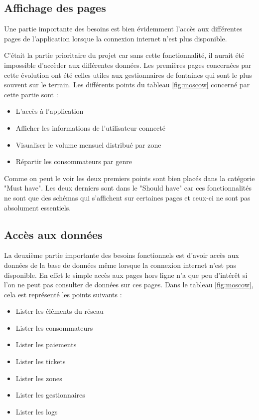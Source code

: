 \documentclass{EPL-master-thesis-covers-FR}
\begin{document}
			
			
			\subsection*{Affichage des pages}
				Une partie importante des besoins est bien évidemment l'accès aux différentes pages de l'application lorsque la connexion internet n'est plus disponible. 
				
				C'était la partie prioritaire du projet car sans cette fonctionnalité, il aurait été impossible d'accèder aux différentes données. Les premières pages concernées par cette évolution ont été celles utiles aux gestionnaires de fontaines qui sont le plus souvent sur le terrain.
				Les différents points du tableau \ref{fig:moscow} concerné par cette partie sont :
				\begin{itemize}
					\item L'accès à l'application
					\item Afficher les informations de l'utilisateur connecté
					\item Visualiser le volume mensuel distribué par zone
					\item Répartir les consommateurs par genre
				\end{itemize}
				
				Comme on peut le voir les deux premiers points sont bien placés dans la catégorie "Must have". Les deux derniers sont dans le "Should have" car ces fonctionnalités ne sont que des schémas qui s'affichent sur certaines pages et ceux-ci ne sont pas absolument essentiels.
				
			\subsection*{Accès aux données}
				La deuxième partie importante des besoins fonctionnels est d'avoir accès aux données de la base de données même lorsque la connexion internet n'est pas disponible. En effet le simple accès aux pages hors ligne n'a que peu d'intérêt si l'on ne peut pas consulter de données sur ces pages.
			Dans le tableau \ref{fig:moscow}, cela est représenté les points suivants :
				\begin{itemize}
					\item Lister les éléments du réseau
					\item Lister les consommateurs
					\item Lister les paiements
					\item Lister les tickets
					\item Lister les zones
					\item Lister les gestionnaires
					\item Lister les logs
				\end{itemize}
				
\end{document}

